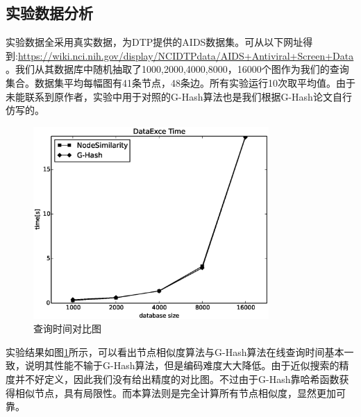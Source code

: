 \documentclass{XDBAthesis}
\begin{document}
\subsection{实验数据分析}
实验数据全采用真实数据，为DTP提供的AIDS数据集。可从以下网址得到:\url{https://wiki.nci.nih.gov/display/NCIDTPdata/AIDS+Antiviral+Screen+Data}。我们从其数据库中随机抽取了1000,2000,4000,8000，16000个图作为我们的查询集合。数据集平均每幅图有41条节点，48条边。所有实验运行10次取平均值。由于未能联系到原作者，实验中用于对照的G-Hash算法也是我们根据G-Hash论文\cite{ghash}自行仿写的。
\begin{figure}[htb]
    \centering
    \includegraphics[width=0.8\textwidth]{../figures/THC/G-Hashcomapre}
    \caption{查询时间对比图}
    \label{fg:ghashtime}
\end{figure}

实验结果如图\ref{fg:ghashtime}所示，可以看出节点相似度算法与G-Hash算法在线查询时间基本一致，说明其性能不输于G-Hash算法，但是编码难度大大降低。由于近似搜索的精度并不好定义，因此我们没有给出精度的对比图。不过由于G-Hash靠哈希函数获得相似节点，具有局限性。而本算法则是完全计算所有节点相似度，显然更加可靠。

\ifx\allfiles\undefined
%

\end{document}
